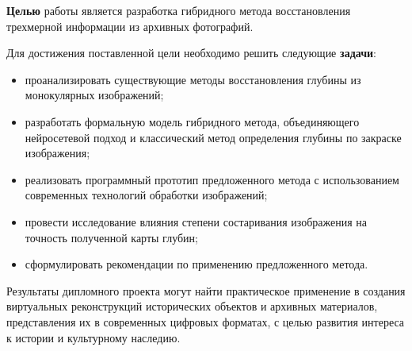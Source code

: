 \textbf{Целью} работы является разработка гибридного метода восстановления трехмерной информации из архивных фотографий.

Для достижения поставленной цели необходимо решить следующие \textbf{задачи}:
\begin{itemize}
    \item проанализировать существующие методы восстановления глубины из монокулярных изображений;
    \item разработать формальную модель гибридного метода, объединяющего нейросетевой подход и классический метод определения глубины по закраске изображения;
    \item реализовать программный прототип предложенного метода с использованием современных технологий обработки изображений;
    \item провести исследование влияния степени состаривания изображения на точность полученной карты глубин;
    \item сформулировать рекомендации по применению предложенного метода.
\end{itemize}

Результаты дипломного проекта могут найти практическое применение в
создания виртуальных реконструкций исторических объектов и архивных материалов,
 представления их в современных цифровых форматах,
с целью развития интереса к истории и
культурному наследию.


